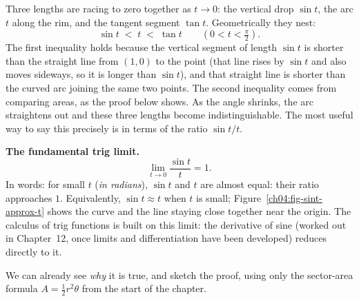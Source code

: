 Three lengths are racing to zero together as $t\to 0$: the vertical drop $\sin t$, the arc $t$ along the rim, and the tangent segment $\tan t$. Geometrically they nest:
\[
  \sin t \;<\; t \;<\; \tan t \qquad (0 < t < \tfrac{\pi}{2}).
\]
The first inequality holds because the vertical segment of length $\sin t$ is shorter than the straight line from $(1,0)$ to the point (that line rises by $\sin t$ and also moves sideways, so it is longer than $\sin t$), and that straight line is shorter than the curved arc joining the same two points. The second inequality comes from comparing areas, as the proof below shows. As the angle shrinks, the arc straightens out and these three lengths become indistinguishable. The most useful way to say this precisely is in terms of the ratio $\sin t / t$.

\begin{focusbox}
\textbf{The fundamental trig limit.}
\[
  \boxed{\;\lim_{t\to 0}\frac{\sin t}{t} = 1.\;}
\]
In words: for small $t$ (\emph{in radians}), $\sin t$ and $t$ are almost equal: their ratio approaches $1$. Equivalently, $\sin t \approx t$ when $t$ is small; Figure~\ref{ch04:fig-sint-approx-t} shows the curve and the line staying close together near the origin. The calculus of trig functions is built on this limit: the derivative of sine (worked out in Chapter~12, once limits and differentiation have been developed) reduces directly to it.
\end{focusbox}

We can already see \emph{why} it is true, and sketch the proof, using only the sector-area formula $A = \tfrac12 r^2\theta$ from the start of the chapter.

